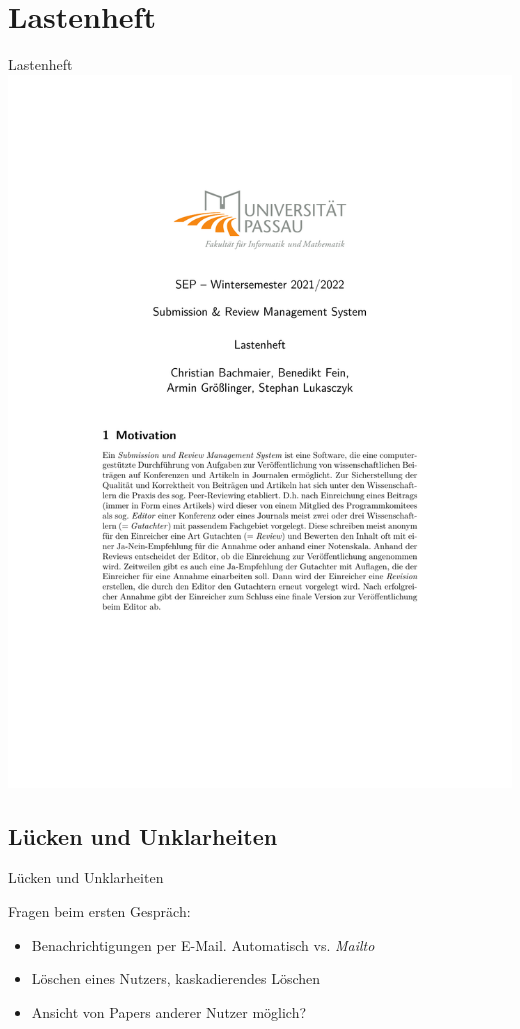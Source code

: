 \documentclass{beamer}
\begin{document}
\section{Lastenheft}
\begin{frame}{Lastenheft}
	\centering
	\includegraphics[height=1.1\textheight]{../../docs/Lastenheft/lastenheft}
\end{frame}


\subsection{Lücken und Unklarheiten}
\begin{frame}{Lücken und Unklarheiten}

	Fragen beim ersten Gespräch:
	\pause

	\begin{itemize}
		\item Benachrichtigungen per E-Mail. Automatisch vs. \emph{Mailto}
		\pause
		\item Löschen eines Nutzers, kaskadierendes Löschen
		\pause
		\item Ansicht von Papers anderer Nutzer möglich?
	\end{itemize}

\end{frame}
\end{document}
